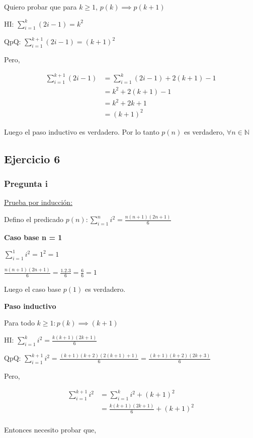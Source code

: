 Quiero probar que para $k \geq 1$, $p(k) \implies p(k+1)$

HI: $\sum_{i=1}^{k}(2i-1) = k^2$

QpQ: $\sum_{i=1}^{k+1}(2i-1) = (k+1)^2$

Pero,

\begin{align*}
    \sum_{i=1}^{k+1}(2i-1) &= \sum_{i=1}^{k}(2i-1) + 2(k+1)-1 \\
    &= k^2 + 2(k+1)-1 \\
    &= k^2 + 2k+1 \\
    &= (k+1)^2
\end{align*}

Luego el paso inductivo es verdadero. Por lo tanto $p(n)$ es verdadero, $\forall n \in \mathbb{N}$

\subsection{Ejercicio 6}

\subsubsection{Pregunta i}

\underline{Prueba por inducción:}

Defino el predicado $p(n) : \sum_{i=1}^{n}i^2 = \frac{n(n+1)(2n+1)}{6}$

\textbf{Caso base n = 1}

$\sum_{i=1}^{1}i^2 = 1^2 = 1$

$\frac{n(n+1)(2n+1)}{6} = \frac{1.2.3}{6} = \frac{6}{6} = 1$

Luego el caso base $p(1)$ es verdadero.

\textbf{Paso inductivo}

Para todo $k \geq 1: p(k) \implies (k+1)$

HI: $\sum_{i=1}^{k}i^2 =  \frac{k(k+1)(2k+1)}{6}$

QpQ: $\sum_{i=1}^{k+1}i^2 =  \frac{(k+1)(k+2)(2(k+1)+1)}{6} =  \frac{(k+1)(k+2)(2k+3)}{6}$

Pero,

\begin{align*}
    \sum_{i=1}^{k+1}i^2 &= \sum_{i=1}^{k}i^2 + (k+1)^2 \\
    &= \frac{k(k+1)(2k+1)}{6} + (k+1)^2 \\
\end{align*}

Entonces necesito probar que, 

